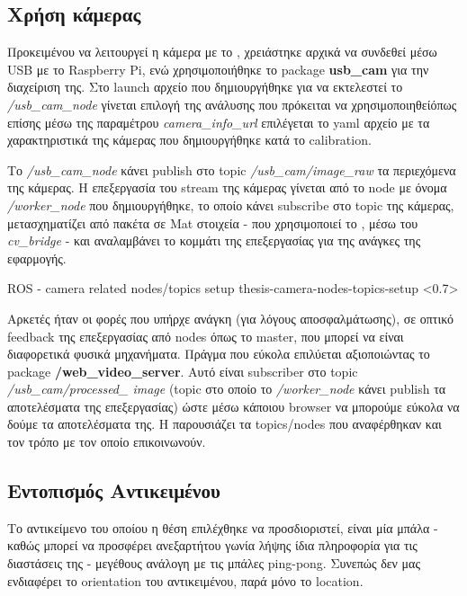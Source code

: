 \subsection{Χρήση κάμερας} \label{sec:camera-usage}
Προκειμένου να λειτουργεί η κάμερα με το , χρειάστηκε αρχικά να συνδεθεί μέσω USB με το Raspberry Pi, ενώ χρησιμοποιήθηκε το package \textbf{usb\_cam} για την διαχείριση της. Στο launch αρχείο που δημιουργήθηκε για να εκτελεστεί το \textit{/usb\_cam\_node} γίνεται επιλογή της ανάλυσης που πρόκειται να χρησιμοποιηθεί\udot όπως επίσης μέσω της παραμέτρου \textit{camera\_info\_url} επιλέγεται το yaml αρχείο με τα χαρακτηριστικά της κάμερας που δημιουργήθηκε κατά το calibration. 

Το \textit{/usb\_cam\_node} κάνει publish στο topic \textit{/usb\_cam/image\_raw} τα περιεχόμενα της κάμερας. Η επεξεργασία του stream της κάμερας γίνεται από το node με όνομα \textit{/worker\_node} που δημιουργήθηκε, το οποίο κάνει subscribe στο topic της κάμερας, μετασχηματίζει από πακέτα  σε Mat στοιχεία - που χρησιμοποιεί το ,  μέσω του \textit{cv\_bridge} - και αναλαμβάνει το κομμάτι της  επεξεργασίας για της ανάγκες της εφαρμογής. 

%
{ROS - camera related nodes/topics setup}%
{thesis-camera-nodes-topics-setup}%
<0.7>

Αρκετές ήταν οι φορές που υπήρχε ανάγκη (για λόγους αποσφαλμάτωσης), σε οπτικό feedback της  επεξεργασίας από nodes όπως το master, που μπορεί να είναι διαφορετικά φυσικά μηχανήματα. Πράγμα που εύκολα επιλύεται αξιοποιώντας το package \textbf{/web\_video\_server}. Αυτό είναι subscriber στο topic \textit{/usb\_\-cam/processed\_ image} (topic στο οποίο το \textit{/worker\_node} κάνει publish τα αποτελέσματα της επεξεργασίας) ώστε μέσω κάποιου browser να μπορούμε εύκολα να δούμε τα αποτελέσματα της. Η  παρουσιάζει τα topics/nodes που αναφέρθηκαν και τον τρόπο με τον οποίο επι\-κοι\-νω\-νούν.

\subsection{Εντοπισμός Αντικειμένου}
Το αντικείμενο του οποίου η θέση επιλέχθηκε να προσδιοριστεί, είναι μία μπάλα - καθώς μπορεί να προσφέρει ανεξαρτήτου γωνία λήψης ίδια πληροφορία για τις διαστάσεις της - μεγέθους ανάλογη με τις μπάλες ping-pong. 
Συνεπώς δεν μας ενδιαφέρει το orientation του αντικειμένου, παρά μόνο το location.


